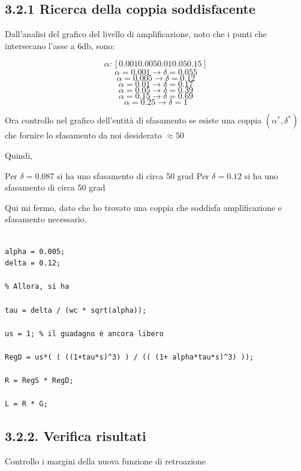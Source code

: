 \documentclass{article}
\begin{document}
\subsection*{3.2.1 Ricerca della coppia soddisfacente}

\begin{par}
Dall'analisi del grafico del livello di amplificazione, noto che i punti
che intersecano l'asse a 6db, sono:

$$ \alpha : [0.001 0.005 0.01 0.05 0.15] $$
$$ \alpha = 0.001 \rightarrow \delta = 0.055 $$
$$ \alpha = 0.005 \rightarrow  \delta = 0.12 $$
$$ \alpha = 0.01  \rightarrow  \delta = 0.17 $$
$$ \alpha = 0.05  \rightarrow  \delta = 0.39 $$
$$ \alpha = 0.15  \rightarrow  \delta = 0.69 $$
$$ \alpha = 0.25  \rightarrow  \delta = 1 $$

Ora controllo nel grafico dell'entità di sfasamento se esiste una coppia
$ (\alpha^{*}, \delta^{*}) $  che fornire lo sfasamento da noi desiderato $ \approx 50 $

Quindi,

Per $ \delta = 0.087 $  si ha uno sfasamento di circa 50 grad
Per $ \delta = 0.12 $ si ha uno sfasamento di circa 50 grad

Qui mi fermo, dato che ho trovato una coppia che soddisfa amplificazione e sfasamento necessario.
\end{par}
\begin{verbatim}

alpha = 0.005;
delta = 0.12;

% Allora, si ha

tau = delta / (wc * sqrt(alpha));

us = 1; % il guadagno è ancora libero

RegD = us*( ( ((1+tau*s)^3) ) / (( (1+ alpha*tau*s)^3) ));

R = RegS * RegD;

L = R * G;
\end{verbatim}


\subsection*{3.2.2. Verifica risultati}

\begin{par}
Controllo i margini della nuova funzione di retroazione
\end{par}
\end{document}
